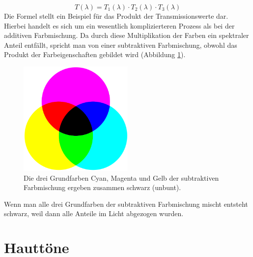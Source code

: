 \begin{equation}\label{gl_farbe-}
		T(\lambda) = T_{1}(\lambda) \cdot T_{2}(\lambda) \cdot T_{3}(\lambda)
	\end{equation}
Die Formel stellt ein Beispiel für das Produkt der Transmissionswerte dar.
Hierbei handelt es sich um ein wesentlich komplizierteren Prozess als bei der additiven Farbmischung. Da durch diese Multiplikation der Farben ein spektraler Anteil entfällt, spricht man von einer subtraktiven Farbmischung, obwohl das Produkt der Farbeigenschaften gebildet wird (Abbildung \ref{b_farben-}).

\begin{figure}[H]     %
\centering
\includegraphics[width=0.5\textwidth]{bilder/farben-} 
\caption {Die drei Grundfarben Cyan, Magenta und Gelb der subtraktiven Farbmischung ergeben zusammen schwarz (unbunt).\protect\footnotemark}\label{b_farben-}
\end{figure}



Wenn man alle drei Grundfarben der subtraktiven Farbmischung mischt entsteht schwarz, weil dann alle Anteile im Licht abgezogen wurden.


\section{Hauttöne}
 
